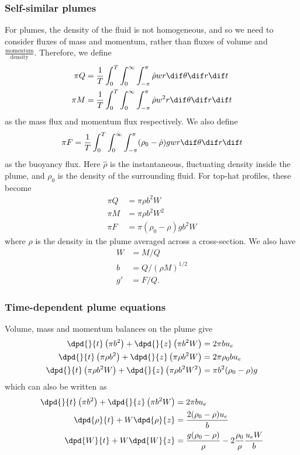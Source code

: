 \subsubsection{Self-similar plumes}
For plumes, the density of the fluid is not homogeneous, and so we need to consider fluxes of mass and momentum, rather than fluxes of volume and $\displaystyle\frac{\text{momentum}}{\text{density}}$. Therefore, we define
\begin{align}
 \pi Q	&= \frac{1}{T}\int_0^T \int_0^\infty \int_{-\pi}^\pi \hat\rho w r \dif \theta\dif r \dif t \\ 
 \pi M	&= \frac{1}{T}\int_0^T \int_0^\infty \int_{-\pi}^\pi \hat\rho w^2 r \dif \theta\dif r \dif t \\  
\end{align}
as the mass flux and momentum flux respectively. We also define
\begin{equation}
 \pi F		= \frac{1}{T}\int_0^T \int_0^\infty \int_{-\pi}^\pi (\rho_0 - \hat\rho) g w r \dif \theta\dif r \dif t \\ 
\end{equation}
as the buoyancy flux. Here $\hat\rho$ is the instantaneous, fluctuating density inside the plume, and $\rho_0$ is the density of the surrounding fluid. For top-hat profiles, these become
\begin{align}
 \pi Q	&= \pi\rho b^2 W \\
 \pi M	&= \pi\rho b^2 W^2 \\
 \pi F		&= \pi(\rho_0 - \rho) gb^2W
\end{align}
where $\rho$ is the density in the plume averaged across a cross-section. We also have
\begin{align}
 W		&= M/Q \\
 b		&= Q/(\rho M)^{1/2} \\
 g'		&= F/Q.
\end{align}

\subsubsection{Time-dependent plume equations}

Volume, mass and momentum balances on the plume give
\begin{align}
 \dpd{}{t} \left(\pi b^2\right) + \dpd{}{z} \left(\pi b^2 W\right) &= 2\pi b u_e \\
 \dpd{}{t} \left(\pi \rho b^2\right) + \dpd{}{z} \left(\pi \rho b^2 W\right) &= 2\pi \rho_0 b u_e \\
 \dpd{}{t} \left(\pi \rho b^2 W\right) + \dpd{}{z} \left(\pi \rho b^2 W^2\right) &= \pi b^2 (\rho_0 - \rho) g \\
\end{align}
which can also be written as 
\begin{align}
 \dpd{}{t} \left(\pi b^2\right) + \dpd{}{z} \left(\pi b^2 W\right) &= 2\pi b u_e \\
 \dpd{\rho}{t} + W\dpd{\rho}{z} &= \frac{2(\rho_0 - \rho) u_e}{b} \\
 \dpd{W}{t} + W\dpd{W}{z} &= \frac{g (\rho_0 - \rho)}{\rho} - 2\frac{\rho_0}{\rho} \frac{u_e W}{b}
\end{align}

